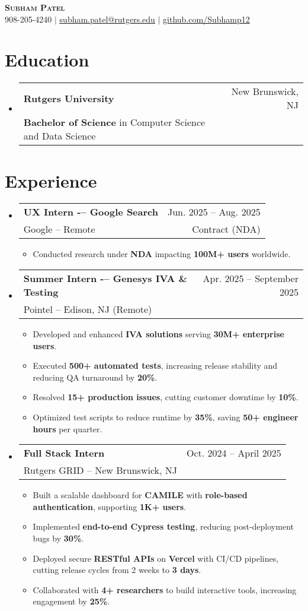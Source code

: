\documentclass[letterpaper,11pt]{article}
\makeatletter
\newcommand{\resumeItem}[1]{
  \item\small{
    {#1 \vspace{-2pt}}
  }
}
\newcommand{\resumeSubheading}[4]{
  \vspace{-2pt}\item
    \begin{tabular*}{0.97\textwidth}[t]{l@{\extracolsep{\fill}}r}
      \textbf{#1} & #2 \\
      {\small#3} & {\small #4} \\
    \end{tabular*}\vspace{-7pt}
}
\newcommand{\resumeItemListStart}{\begin{itemize}}
\newcommand{\resumeItemListEnd}{\end{itemize}\vspace{-5pt}}
\makeatother
\begin{document}
\begin{center}
    \textbf{\Huge \scshape Subham Patel} \\ \vspace{1pt}
    \small 908-205-4240 $|$ \href{mailto:subham.patel@rutgers.edu}{\underline{subham.patel@rutgers.edu}} $|$ 
    \href{https://github.com/Subhamp12}{\underline{github.com/Subhamp12}}
\end{center}

\section{Education}
  \begin{itemize}[leftmargin=0.15in, label={}]
    \resumeSubheading
      {Rutgers University}{New Brunswick, NJ}
      {\textbf{Bachelor of Science} in Computer Science and Data Science}{}
  \end{itemize}

\section{Experience}
  \begin{itemize}[leftmargin=0.15in, label={}]
    \resumeSubheading
      {UX Intern -– Google Search}{Jun. 2025 -- Aug. 2025}
      {Google -- Remote}{Contract (NDA)}
      \resumeItemListStart
        \resumeItem{Conducted research under \textbf{NDA} impacting \textbf{100M+ users} worldwide.}
      \resumeItemListEnd

    \resumeSubheading
      {Summer Intern -– Genesys IVA \& Testing}{Apr. 2025 -- September 2025}
      {Pointel -- Edison, NJ (Remote)}{}
      \resumeItemListStart
        \resumeItem{Developed and enhanced \textbf{IVA solutions} serving \textbf{30M+ enterprise users}.}
        \resumeItem{Executed \textbf{500+ automated tests}, increasing release stability and reducing QA turnaround by \textbf{20\%}.}
        \resumeItem{Resolved \textbf{15+ production issues}, cutting customer downtime by \textbf{10\%}.}
        \resumeItem{Optimized test scripts to reduce runtime by \textbf{35\%}, saving \textbf{50+ engineer hours} per quarter.}
      \resumeItemListEnd

    \resumeSubheading
      {Full Stack Intern}{Oct. 2024 -- April 2025}
      {Rutgers GRID -- New Brunswick, NJ}{}
      \resumeItemListStart
        \resumeItem{Built a scalable dashboard for \textbf{CAMILE} with \textbf{role-based authentication}, supporting \textbf{1K+ users}.}
        \resumeItem{Implemented \textbf{end-to-end Cypress testing}, reducing post-deployment bugs by \textbf{30\%}.}
        \resumeItem{Deployed secure \textbf{RESTful APIs} on \textbf{Vercel} with CI/CD pipelines, cutting release cycles from 2 weeks to \textbf{3 days}.}
        \resumeItem{Collaborated with \textbf{4+ researchers} to build interactive tools, increasing engagement by \textbf{25\%}.}
      \resumeItemListEnd
  \end{itemize}
\end{document}
